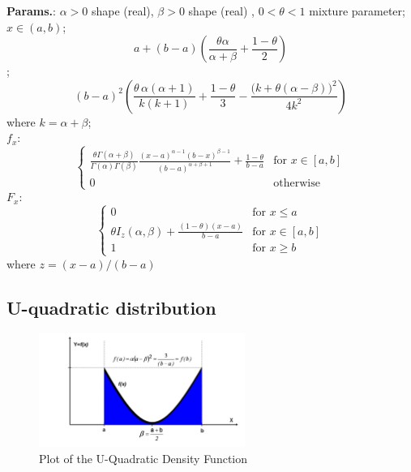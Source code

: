    {\color{darkblue} \textbf{Params.}:} {$\alpha > 0$ shape (real),  $\beta > 0$ shape (real) ,  $0<\theta <1 $ mixture parameter}; {$x \in (a, b)\!$}; {$$a + (b-a) \left(\frac{\theta \alpha}{\alpha + \beta} + 
\frac{1-\theta}{2} \right)$$}; {$$(b-a)^2\left(\frac{\theta\,\alpha(\alpha+1)}{k(k+1)} +
\frac{1-\theta}{3} - \frac{\bigl(k+\theta(\alpha-\beta)\bigr)^2}{4k^2}\right)$$ where $k=\alpha+\beta$};\hspace{0.5cm}\\{\color{darkblue} \textbf{$f_x$}:} {$$\begin{cases}
\frac{\theta \Gamma(\alpha + \beta)}{\Gamma(\alpha)\Gamma(\beta)}
\frac{(x - a)^{\alpha-1}  (b-x)^{\beta - 1} }{(b - a)^{\alpha + \beta + 1}}
 + \frac{1 - \theta}{b-a}
& \text{for } x \in [a,b]  \\
                  0               & \text{otherwise}
                \end{cases}$$}{\color{darkblue} \textbf{$F_x$}:} {$$\begin{cases}
                  0               & \text{for } x \le a \\
\theta I_z(\alpha,\beta) + \frac{(1-\theta)(x-a)}{b-a} & \text{for } x \in [a,b] \\
                  1               & \text{for } x \ge b
                \end{cases}$$ where $z=(x-a)/(b-a)$}



    
        
\subsection{U-quadratic distribution}


    \begin{figure}[H]
        \centering
        \includegraphics[width=0.6\textwidth]{images/Distributions UQuadratic PDF.jpg}
        \caption{Plot of the U-Quadratic Density Function}
    \end{figure}




